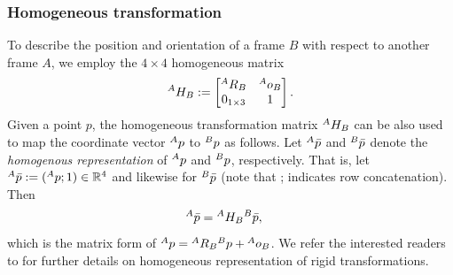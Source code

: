 \subsubsection{Homogeneous transformation}
To describe the position and orientation of a frame $B$ with respect to another frame $A$, we employ the $4\times4$ homogeneous matrix
\begin{equation}
  \label{eq:homogeneousTransformation}
  \hspace{0em}^A H_B :=
     \begin{bmatrix}
     \hspace{0em}^A R_B & \hspace{0em}^A o_B \\
     0_{1\times3} & 1
  \end{bmatrix} .
\end{equation}
Given a point $p$, the homogeneous transformation matrix $\hspace{0em}^A H_B$ can be also used to map the coordinate vector $\hspace{0em}^A p$ to $\hspace{0em}^B p$ as follows. Let 
$\hspace{0em}^A \bar p$ and $\hspace{0em}^B \bar p$ denote the {\em homogenous representation} of $\hspace{0em}^A p$ and $\hspace{0em}^B p$, respectively. That is, let
$\hspace{0em}^A \bar p := (\hspace{0em}^A p; 1) \in \mathbb{R}^4$ and likewise for
$\hspace{0em}^B \bar p$ (note that ; indicates row concatenation). Then
\begin{align} \label{eq:Abp_AHB_Bbp}
  \hspace{0em}^A \bar p 
& = 
  \hspace{0em}^A H_B \hspace{0em}^B \bar p ,
\end{align}
which is the matrix form of 
$\hspace{0em}^A p = \hspace{0em}^A R_B \hspace{0em}^B p + \hspace{0em}^A o_B$. We refer the interested readers to \citep[Chapter 2]{murray1994} for further details on homogeneous representation of rigid transformations. 

